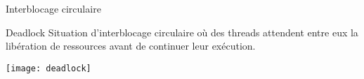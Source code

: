 
\begingroup

\begin{frame}{Interblocage circulaire}
  \begin{block}{Deadlock}
    Situation  d'\alert{interblocage circulaire}  où  des threads  attendent
    entre eux la libération de ressources avant de continuer leur exécution.
  \end{block}
  \begin{center}
    \texttt{[image: deadlock]}
  \end{center}
\end{frame}

\endgroup
\endinput
